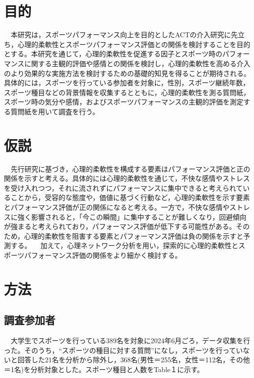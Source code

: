\documentclass[12pt,a4paper,xelatex,ja=standard]{bxjsarticle}
\begin{document}
\hypertarget{ux76eeux7684}{%
\section{目的}\label{ux76eeux7684}}

　本研究は，スポーツパフォーマンス向上を目的としたACTの介入研究に先立ち，心理的柔軟性とスポーツパフォーマンス評価との関係を検討することを目的とする。本研究を通じて，心理的柔軟性を促進する因子とスポーツ時のパフォーマンスに関する主観的評価や感情との関係を検討し，心理的柔軟性を高める介入のより効果的な実施方法を検討するための基礎的知見を得ることが期待される。具体的には，スポーツを行っている参加者を対象に，性別，スポーツ継続年数，スポーツ種目などの背景情報を収集するとともに，心理的柔軟性を測る質問紙，スポーツ時の気分や感情，およびスポーツパフォーマンスの主観的評価を測定する質問紙を用いて調査を行う。

\hypertarget{ux4eeeux8aac}{%
\section{仮説}\label{ux4eeeux8aac}}

　先行研究に基づき，心理的柔軟性を構成する要素はパフォーマンス評価と正の関係を示すと考える。具体的には心理的柔軟性を通じて，不快な感情やストレスを受け入れつつ，それに流されずにパフォーマンスに集中できると考えられていることから，受容的な態度や，価値に基づく行動など，心理的柔軟性を示す要素とパフォーマンス評価が正の関係になると考える。一方で，不快な感情やストレスに強く影響されると，「今この瞬間」に集中することが難しくなり，回避傾向が強まると考えられており，パフォーマンス評価が低下する可能性がある。そのため，心理的柔軟性を阻害する要素とパフォーマンス評価は負の関係を示すと予測する。
　加えて，心理ネットワーク分析を用い，探索的に心理的柔軟性とスポーツパフォーマンス評価の関係をより細かく検討する。

\clearpage

\hypertarget{ux65b9ux6cd5}{%
\section{方法}\label{ux65b9ux6cd5}}

\hypertarget{ux8abfux67fbux53c2ux52a0ux8005}{%
\subsection{調査参加者}\label{ux8abfux67fbux53c2ux52a0ux8005}}

　大学生でスポーツを行っている389名を対象に2024年6月ごろ，データ収集を行った。そのうち，``スポーツの種目に対する質問''になし，スポーツを行っていないと回答した21名を分析から除外し，368名(男性＝255名，女性＝112名，その他＝1名)を分析対象とした。スポーツ種目と人数をTable１に示す。
\end{document}
